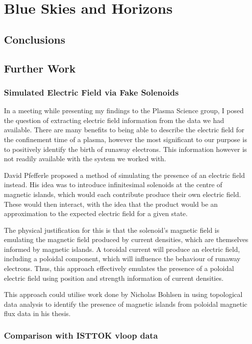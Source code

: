 
\chapter{Blue Skies and Horizons}
\label{chapter6}

\section{Conclusions}

\section{Further Work}

\subsection{Simulated Electric Field via Fake Solenoids}

In a meeting while presenting my findings to the Plasma Science group, I 
posed the question of extracting electric field information from the data 
we had available. There are many benefits to being able to describe the 
electric field for the confinement time of a plasma, however the 
most significant to our purpose is to positively identify the 
birth of runaway electrons. This information however is not readily 
available with the system we worked with.

David Pfefferle proposed a method of simulating the presence of 
an electric field instead. His idea was to introduce infinitesimal 
solenoids at the centre of magnetic islands, which would each contribute 
produce their own electric field. These would then interact, with the idea 
that the product would be an approximation to the expected 
electric field for a given state. 

The physical justification for this is that the solenoid's magnetic field is 
emulating the magnetic field produced by current densities, which 
are themselves informed by magnetic islands. A toroidal current 
will produce an electric field, including a poloidal component, which 
will influence the behaviour of runaway electrons. Thus, this approach 
effectively emulates the presence of a poloidal electric field using 
position and strength information of current densities.

This approach could utilise work done by Nicholas Bohlsen in using topological 
data analysis to identify the presence of magnetic islands from poloidal magnetic flux data in his thesis.

\subsection{Comparison with ISTTOK vloop data}

